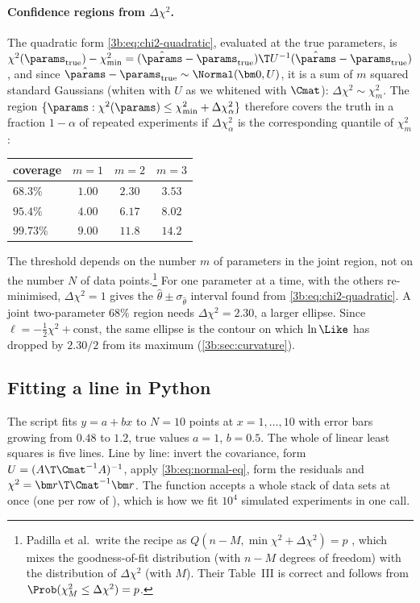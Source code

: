 \paragraph{Confidence regions from $\Delta\chi^2$.}
The quadratic form \eqref{3b:eq:chi2-quadratic}, evaluated at the true
parameters, is
$\chi^2(\params_{\text{true}})-\chi^2_{\min}=(\hat\params-\params_{\text{true}})\T U^{-1}(\hat\params-\params_{\text{true}})$,
and since $\hat\params-\params_{\text{true}}\sim\Normal(\bm0,U)$, it is a
sum of $m$ squared standard Gaussians (whiten with $U$ as we whitened with
$\Cmat$): $\Delta\chi^2\sim\chi^2_m$. The region
$\{\params:\chi^2(\params)\le\chi^2_{\min}+\Delta\chi^2_\alpha\}$ therefore
covers the truth in a fraction $1-\alpha$ of repeated experiments if
$\Delta\chi^2_\alpha$ is the corresponding quantile of $\chi^2_m$
:
\begin{center}
\small
\begin{tabular}{lccc}
  \hline
  coverage & $m=1$ & $m=2$ & $m=3$\\
  \hline
  $68.3\%$ & $1.00$ & $2.30$ & $3.53$\\
  $95.4\%$ & $4.00$ & $6.17$ & $8.02$\\
  $99.73\%$ & $9.00$ & $11.8$ & $14.2$\\
  \hline
\end{tabular}
\end{center}
The threshold depends on the number $m$ of parameters in the joint region,
not on the number $N$ of data points.\footnote{Padilla et al.\ write the recipe
as $Q(n-M,\min\chi^2+\Delta\chi^2)=p$ , which mixes
the goodness-of-fit distribution (with $n-M$ degrees of freedom) with the
distribution of $\Delta\chi^2$ (with $M$). Their Table~III is correct and
follows from $\Prob(\chi^2_M\le\Delta\chi^2)=p$.} For one parameter at a
time, with the others re-minimised, $\Delta\chi^2=1$ gives the
$\hat\theta\pm\sigma_{\hat\theta}$ interval found from
\eqref{3b:eq:chi2-quadratic}. A joint two-parameter $68\%$ region needs
$\Delta\chi^2=2.30$, a larger ellipse. Since $\ell=-\tfrac12\chi^2+\text{const}$,
the same ellipse is the contour on which $\ln\Like$ has dropped by
$2.30/2$ from its maximum (\cref{3b:sec:curvature}).

\subsection{Fitting a line in Python}
\label{3b:sec:ls-python}

The script  fits $y=a+bx$ to $N=10$ points at
$x=1,\dots,10$ with error bars growing from $0.48$ to $1.2$, true values
$a=1$, $b=0.5$. The whole of linear least squares is five lines.
Line by line: invert the covariance, form $U=(A\T\Cmat^{-1}A)^{-1}$, apply
\eqref{3b:eq:normal-eq}, form the residuals and
$\chi^2=\bm r\T\Cmat^{-1}\bm r$. The function accepts a whole stack of data
sets at once (one per row of ), which is how we fit $10^4$
simulated experiments in one call.

